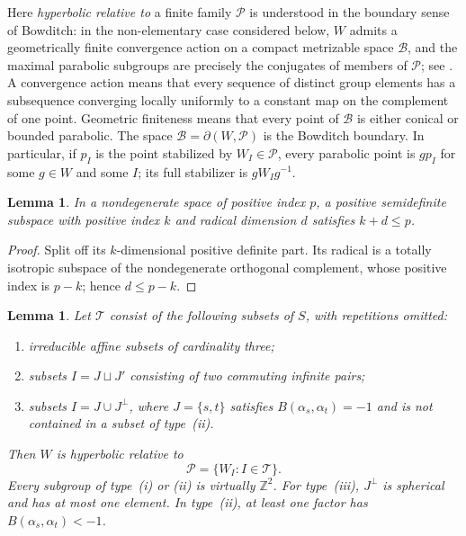 \documentclass[11pt,reqno]{amsart}
\theoremstyle{plain}
\newtheorem{lemma}[theorem]{Lemma}
\theoremstyle{definition}
\theoremstyle{remark}
\numberwithin{equation}{section}
\begin{document}
\noindent
Here \emph{hyperbolic relative to} a finite family $\mathcal P$
is understood in the boundary sense of Bowditch: in the non-elementary
case considered below, $W$ admits a geometrically finite convergence
action on a compact metrizable space $\mathcal B$, and the maximal
parabolic subgroups are precisely the conjugates of members of
$\mathcal P$; see \cite{Bowditch}.
A convergence action means that every sequence of distinct group
elements has a subsequence converging locally uniformly to a constant
map on the complement of one point.
Geometric finiteness means that every point of $\mathcal B$ is either
conical or bounded parabolic.
The space $\mathcal B=\partial(W,\mathcal P)$ is the Bowditch boundary.
In particular, if $p_I$ is the point stabilized by $W_I\in\mathcal P$,
every parabolic point is $g p_I$ for some $g\in W$ and some $I$;
its full stabilizer is $gW_Ig^{-1}$.

\begin{lemma}\label{lem:positive-index-bound}
In a nondegenerate space of positive index $p$, a positive semidefinite subspace with positive index $k$ and radical dimension $d$ satisfies $k+d\leq p$.
\end{lemma}
\begin{proof}
Split off its $k$-dimensional positive definite part. Its radical is a totally isotropic subspace of the nondegenerate orthogonal complement, whose positive index is $p-k$; hence $d\leq p-k$.
\end{proof}

\begin{lemma}\label{lem:32-peripherals}
Let $\mathcal T$ consist of the following subsets of $S$,
with repetitions omitted:
\begin{enumerate}[label=(\roman*)]
    \item irreducible affine subsets of cardinality three;
    \item subsets $I=J\sqcup J'$ consisting of two commuting
    infinite pairs;
    \item subsets $I=J\cup J^\perp$, where
    $J=\{s,t\}$ satisfies $B(\alpha_s,\alpha_t)=-1$
    and is not contained in a subset of type~\textup{(ii)}.
\end{enumerate}
Then $W$ is hyperbolic relative to
\[
    \mathcal P=\{W_I:I\in\mathcal T\}.
\]
Every subgroup of type~\textup{(i)} or \textup{(ii)}
is virtually $\mathbb Z^2$.
For type~\textup{(iii)}, $J^\perp$ is spherical and has
at most one element.
In type~\textup{(ii)}, at least one factor has
$B(\alpha_s,\alpha_t)<-1$.
\end{lemma}
\end{document}
